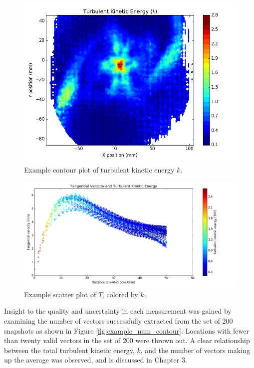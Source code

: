 {\begin{figure}[H]
	\centering
	\includegraphics[width=5in]{figs/example_vortex_figs/example_ctke_contour}
\caption{Example contour plot of turbulent kinetic energy $k$.}
\label{fig:examp_tke}
\end{figure}

\begin{figure}[H]
	\centering
	\includegraphics[width=6.5in]{figs/example_vortex_figs/example_TscatterTKE}
\caption{Example scatter plot of $T$, colored by $k$.}
\label{fig:examp_Tscatter}
\end{figure}

Insight to the quality and uncertainty in each measurement was gained by 
examining the number of vectors successfully extracted from the set of 200 
snapshots as shown in Figure \ref{fig:example_num_contour}. Locations with 
fewer than twenty valid vectors in the set of 200 were thrown out. A clear 
relationship between the total turbulent kinetic energy, $k$, and the number of 
vectors making up the average was observed, and is discussed in Chapter 3.

}
